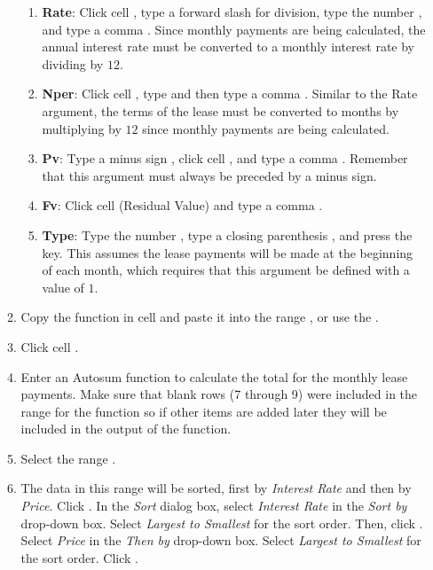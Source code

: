 \begin{enumerate}
\begin{enumerate}
		\begin{enumerate}
			\item \textbf{Rate}: Click cell , type a forward slash \fmtTyping{/} for division, type the number , and type a comma \fmtTyping{,}. Since monthly payments are being calculated, the annual interest rate must be converted to a monthly interest rate by dividing by $ 12 $.
			
			\item \textbf{Nper}: Click cell , type  and then type a comma \fmtTyping{,}. Similar to the Rate argument, the terms of the lease must be converted to months by multiplying by $ 12 $ since monthly payments are being calculated.
			
			\item \textbf{Pv}: Type a minus sign \fmtTyping{-}, click cell , and type a comma \fmtTyping{,}. Remember that this argument must always be preceded by a minus sign.
			
			\item \textbf{Fv}: Click cell  (Residual Value) and type a comma \fmtTyping{,}.
			
			\item \textbf{Type}: Type the number , type a closing parenthesis \fmtTyping{)}, and press the  key. This assumes the lease payments will be made at the beginning of each month, which requires that this argument be defined with a value of $ 1 $.
		\end{enumerate}
	
		\item Copy the  function in cell  and paste it into the range , or use the .
		
		\item Click cell . 
		
		\item Enter an Autosum function to calculate the total for the monthly lease payments. Make sure that blank rows (7 through 9) were included in the range for the  function so if other items are added later they will be included in the output of the  function.
		
		\item Select the range . 
		
		\item The data in this range will be sorted, first by \textit{Interest Rate} and then by \textit{Price}. Click . In the \textit{Sort} dialog box, select \textit{Interest Rate} in the \textit{Sort by} drop-down box. Select \textit{Largest to Smallest} for the sort order. Then, click . Select \textit{Price} in the \textit{Then by} drop-down box. Select \textit{Largest to Smallest} for the sort order. Click .
	

\end{enumerate}
\end{enumerate}
